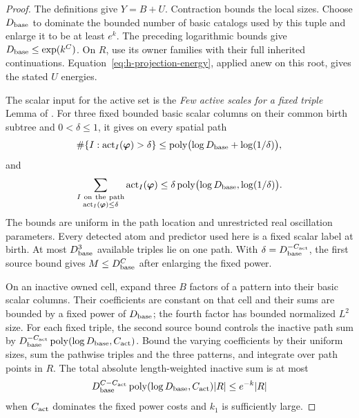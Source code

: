 \begin{proof}
The definitions give \(Y=B+U\).  Contraction bounds the local sizes.
Choose \(D_{\rm base}\) to dominate the bounded number of basic
catalogs used by this tuple and enlarge it to be at least \(e^k\).
The preceding logarithmic bounds give \(D_{\rm base}\le\exp(k^C)\).
On \(R\), use its owner families with their full inherited
continuations.  Equation~\eqref{eq:h-projection-energy}, applied
anew on this root, gives the stated \(U\) energies.

The scalar input for the active set is the
\emph{Few active scales for a fixed triple} Lemma of
\cite[Section~5]{H}.  For three fixed bounded basic scalar columns
on their common birth subtree and \(0<\delta\le1\), it gives on
every spatial path
\[
 \#\{I:\operatorname{act}_I(\boldsymbol\varphi)>\delta\}
 \le\operatorname{poly}\bigl(\log D_{\rm base}+\log(1/\delta)\bigr),
\]
and
\[
 \sum_{\substack{I\ {\rm on\ the\ path}\\
       \operatorname{act}_I(\boldsymbol\varphi)\le\delta}}
       \operatorname{act}_I(\boldsymbol\varphi)
 \le\delta\operatorname{poly}
       \bigl(\log D_{\rm base},\log(1/\delta)\bigr).
\]
The bounds are uniform in the path location and unrestricted real
oscillation parameters.  Every detected atom and predictor used
here is a fixed scalar label at birth.  At most \(D_{\rm base}^3\)
available triples lie on one path.  With
\(\delta=D_{\rm base}^{-C_{\rm act}}\), the first source bound gives
\(M\le D_{\rm base}^C\) after enlarging the fixed power.

On an inactive owned cell, expand three \(B\) factors of a pattern
into their basic scalar columns.  Their coefficients are constant
on that cell and their sums are bounded by a fixed power of
\(D_{\rm base}\); the fourth factor has bounded normalized \(L^2\)
size.  For each fixed triple, the second source bound controls the
inactive path sum by
\(D_{\rm base}^{-C_{\rm act}}
 \operatorname{poly}(\log D_{\rm base},C_{\rm act})\).
Bound the varying coefficients by their uniform sizes, sum the
pathwise triples and the three patterns, and integrate over path
points in \(R\).  The total absolute length-weighted inactive sum
is at most
\[
 D_{\rm base}^{C-C_{\rm act}}
       \operatorname{poly}(\log D_{\rm base},C_{\rm act})|R|
 \le e^{-k}|R|
\]
when \(C_{\rm act}\) dominates the fixed power costs and \(k_1\)
is sufficiently large.


\end{proof}
